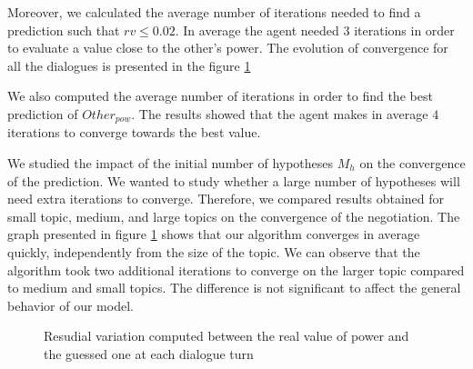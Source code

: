 \documentclass[conference, letterpaper]{IEEEtran}
\begin{document}
	Moreover, we calculated the average number of iterations needed to find a prediction such that $rv \leq 0.02$. In average the agent needed $3$ iterations in order to evaluate a value close to the other's power. The evolution of convergence for all the dialogues is presented in the figure \ref{fig:converge}
	
	We also computed the average number of iterations in order to find the best prediction of $Other_{pow}$. The results showed that the agent makes in average $4$ iterations to converge towards the best value.  

	
	We studied the impact of the initial number of hypotheses $M_h$ on the convergence of the prediction. We wanted to study whether a large number of hypotheses will need extra iterations to converge. Therefore, we compared results obtained for small topic, medium, and large topics on the convergence of the negotiation. The graph presented in figure \ref{fig:converge} shows that our algorithm converges in average quickly, independently from the size of the topic. We can observe that the algorithm took two additional iterations to converge on the larger topic compared to medium and small topics. The difference is not significant to affect the general behavior of our model.
	
	\begin{figure}[]
		\caption{Resudial variation computed between the real value of power and the guessed one at each dialogue turn} 
		\label{fig:converge}
	\end{figure}
	
\end{document}

